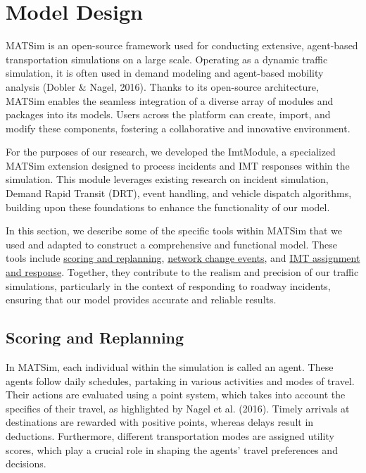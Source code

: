 \documentclass[fancy, oneside, mastersfancy, ms]{byuthesis}
\begin{document}
\hypertarget{sec-MATSim_mod}{%
\section{Model Design}\label{sec-MATSim_mod}}

MATSim is an open-source framework used for conducting extensive,
agent-based transportation simulations on a large scale. Operating as a
dynamic traffic simulation, it is often used in demand modeling and
agent-based mobility analysis (Dobler \& Nagel, 2016). Thanks to its
open-source architecture, MATSim enables the seamless integration of a
diverse array of modules and packages into its models. Users across the
platform can create, import, and modify these components, fostering a
collaborative and innovative environment.

For the purposes of our research, we developed the ImtModule, a
specialized MATSim extension designed to process incidents and IMT
responses within the simulation. This module leverages existing research
on incident simulation, Demand Rapid Transit (DRT), event handling, and
vehicle dispatch algorithms, building upon these foundations to enhance
the functionality of our model.

In this section, we describe some of the specific tools within MATSim
that we used and adapted to construct a comprehensive and functional
model. These tools include \protect\hyperlink{sec-MATSim_score}{scoring
and replanning}, \protect\hyperlink{sec-NCE}{network change events}, and
\protect\hyperlink{sec-imt_response}{IMT assignment and response}.
Together, they contribute to the realism and precision of our traffic
simulations, particularly in the context of responding to roadway
incidents, ensuring that our model provides accurate and reliable
results.

\hypertarget{sec-MATSim_Score}{%
\subsection{Scoring and Replanning}\label{sec-MATSim_Score}}

In MATSim, each individual within the simulation is called an agent.
These agents follow daily schedules, partaking in various activities and
modes of travel. Their actions are evaluated using a point system, which
takes into account the specifics of their travel, as highlighted by
Nagel et al. (2016). Timely arrivals at destinations are rewarded with
positive points, whereas delays result in deductions. Furthermore,
different transportation modes are assigned utility scores, which play a
crucial role in shaping the agents' travel preferences and decisions.
\end{document}
